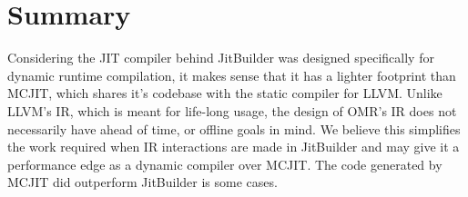 \section{Summary}
\label{sec:summary}
Considering the JIT compiler behind JitBuilder was designed specifically for dynamic runtime compilation, it makes sense that it has a lighter footprint than MCJIT, which shares it's codebase with the static compiler for LLVM.
Unlike LLVM's IR, which is meant for life-long usage, the design of OMR's IR does not necessarily have ahead of time, or offline goals in mind.
We believe this simplifies the work required when IR interactions are made in JitBuilder and may give it a performance edge as a dynamic compiler over MCJIT.
The code generated by MCJIT did outperform JitBuilder is some cases.